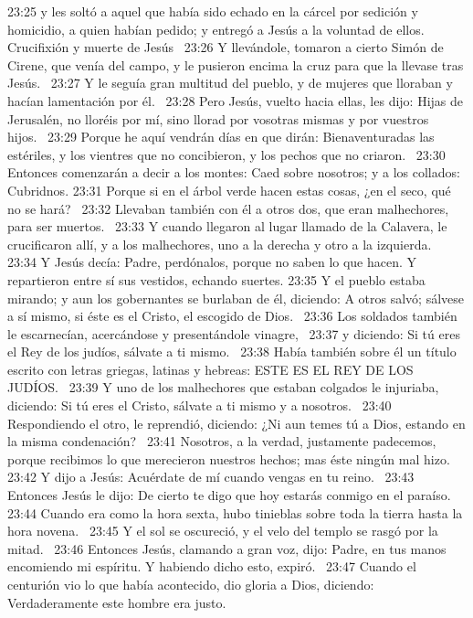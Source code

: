 23:25 y les soltó a aquel que había sido echado en la cárcel por sedición y homicidio, a quien habían pedido; y entregó a Jesús a la voluntad de ellos.  
Crucifixión y muerte de Jesús   
23:26 Y llevándole, tomaron a cierto Simón de Cirene, que venía del campo, y le pusieron encima la cruz para que la llevase tras Jesús.  
23:27 Y le seguía gran multitud del pueblo, y de mujeres que lloraban y hacían lamentación por él.  
23:28 Pero Jesús, vuelto hacia ellas, les dijo: Hijas de Jerusalén, no lloréis por mí, sino llorad por vosotras mismas y por vuestros hijos.  
23:29 Porque he aquí vendrán días en que dirán: Bienaventuradas las estériles, y los vientres que no concibieron, y los pechos que no criaron.  
23:30 Entonces comenzarán a decir a los montes: Caed sobre nosotros; y a los collados: Cubridnos. 
23:31 Porque si en el árbol verde hacen estas cosas, ¿en el seco, qué no se hará?  
23:32 Llevaban también con él a otros dos, que eran malhechores, para ser muertos.  
23:33 Y cuando llegaron al lugar llamado de la Calavera, le crucificaron allí, y a los malhechores, uno a la derecha y otro a la izquierda.  
23:34 Y Jesús decía: Padre, perdónalos, porque no saben lo que hacen. Y repartieron entre sí sus vestidos, echando suertes. 
23:35 Y el pueblo estaba mirando; y aun los gobernantes se burlaban de él, diciendo: A otros salvó; sálvese a sí mismo, si éste es el Cristo, el escogido de Dios.  
23:36 Los soldados también le escarnecían, acercándose y presentándole vinagre,  
23:37 y diciendo: Si tú eres el Rey de los judíos, sálvate a ti mismo.  
23:38 Había también sobre él un título escrito con letras griegas, latinas y hebreas: ESTE ES EL REY DE LOS JUDÍOS.  
23:39 Y uno de los malhechores que estaban colgados le injuriaba, diciendo: Si tú eres el Cristo, sálvate a ti mismo y a nosotros.  
23:40 Respondiendo el otro, le reprendió, diciendo: ¿Ni aun temes tú a Dios, estando en la misma condenación?  
23:41 Nosotros, a la verdad, justamente padecemos, porque recibimos lo que merecieron nuestros hechos; mas éste ningún mal hizo.  
23:42 Y dijo a Jesús: Acuérdate de mí cuando vengas en tu reino.  
23:43 Entonces Jesús le dijo: De cierto te digo que hoy estarás conmigo en el paraíso.  
23:44 Cuando era como la hora sexta, hubo tinieblas sobre toda la tierra hasta la hora novena.  
23:45 Y el sol se oscureció, y el velo del templo se rasgó por la mitad.  
23:46 Entonces Jesús, clamando a gran voz, dijo: Padre, en tus manos encomiendo mi espíritu. Y habiendo dicho esto, expiró.  
23:47 Cuando el centurión vio lo que había acontecido, dio gloria a Dios, diciendo: Verdaderamente este hombre era justo.  
